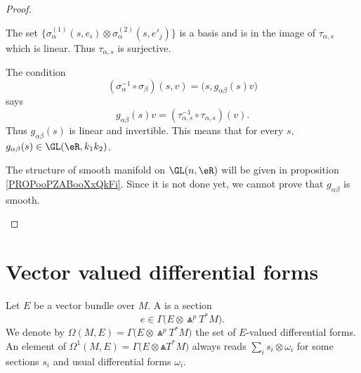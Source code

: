 \begin{proof}
\begin{subproof}
\begin{subproof}
			\spitem[Surjective]
			The set \(    	\{ \sigma_{\alpha}^{(1)}(s,e_i)\otimes \sigma_{\alpha}^{(2)}(s,e'_j) \}  \) is a basis and is in the image of \( \tau_{\alpha,s}\) which is linear. Thus \( \tau_{\alpha,s}\) is surjective.
		\end{subproof}
		The condition
		\begin{equation}
			(\sigma_{\alpha}^{-1}\circ\sigma_{\beta})(s,v)=\big( s,g_{\alpha\beta}(s)v \big)
		\end{equation}
		says
		\begin{equation}
			g_{\alpha\beta}(s)v=(\tau_{\alpha,s}^{-1}\circ\tau_{\alpha,s})(v).
		\end{equation}
		Thus \( g_{\alpha\beta}(s)\) is linear and invertible. This means that for every \( s\), \( g_{\alpha\beta}(s)\in \GL(\eR, k_1k_2)\).
		\begin{probleme}		\label{PROBooGIAHooTCSOyf}
			The structure of smooth manifold on \( \GL(n,\eR)\) will be given in proposition \ref{PROPooPZABooXxQkFi}. Since it is not done yet, we cannot prove that \( g_{\alpha\beta}\) is smooth.
		\end{probleme}
	\end{subproof}
\end{proof}

\section{Vector valued differential forms}	\label{SecVectValFiffFor}

Let $E$ be a vector bundle over $M$. A  is a section
\[
	e\in\Gamma\big( E\otimes\Wedge^pT^*M \big).
\]
We denote by $\Omega(M,E)=\Gamma\big( E\otimes\Wedge^pT^*M \big)$ the set of $E$-valued differential forms. An element of $\Omega^1(M,E)=\Gamma\big( E\otimes\Wedge T^*M\big)$ always reads  $\sum_is_i\otimes\omega_i$ for some sections $s_i$ and usual differential forms $\omega_i$.

